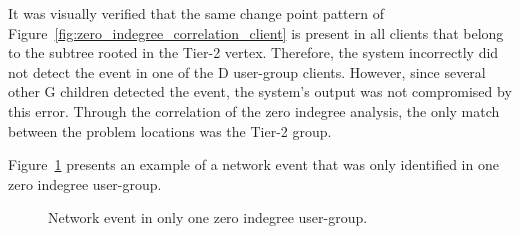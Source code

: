 It was visually verified that the same change point pattern of
Figure~\ref{fig:zero_indegree_correlation_client} is present in all clients
that belong to the subtree rooted in the Tier-2 vertex.
Therefore, the system incorrectly did not detect the event in one of the D
user-group clients.
However, since several other G children detected the
event, the system's output was not compromised by this error.
Through the correlation of the zero indegree analysis,
the only match between the problem locations was the Tier-2 group.

Figure~\ref{fig:zero_indegreee_without_correlation} presents an example of a
network event that was only identified in one zero indegree user-group.

\begin{figure}[H]
    \centering
    \caption{Network event in only one zero indegree user-group.}
\label{fig:zero_indegreee_without_correlation}
\end{figure}%

